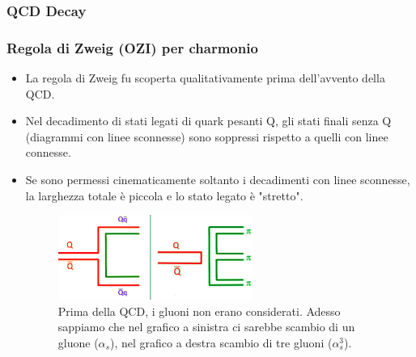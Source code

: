 \subsubsection{QCD Decay}
\subsubsection{Regola di Zweig (OZI) per charmonio}
\begin{itemize}
    \item La regola di Zweig fu scoperta qualitativamente prima dell'avvento della QCD.
    \item Nel decadimento di stati legati di quark pesanti Q, gli stati finali senza Q (diagrammi con linee sconnesse) sono soppressi rispetto a quelli con linee connesse.
    \item Se sono permessi cinematicamente soltanto i decadimenti con linee sconnesse, la larghezza totale è piccola e lo stato legato è "stretto".
    \begin{figure}[H]
        \centering
        \includegraphics[width=0.6\textwidth]{immagini/fig_zweig_charmonium.png}
        \caption{Prima della QCD, i gluoni non erano considerati. Adesso sappiamo che nel grafico a sinistra ci sarebbe scambio di un gluone ($\alpha_s$), nel grafico a destra scambio di tre gluoni ($\alpha_s^3$).}
    \end{figure}
\end{itemize}
